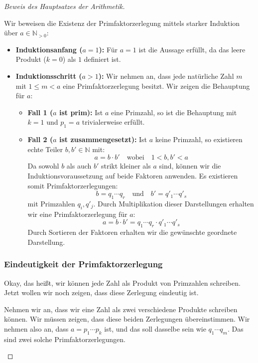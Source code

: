 \begin{proof}[Beweis des Hauptsatzes der Arithmetik]
\begin{math-stroke}
Wir beweisen die Existenz der Primfaktorzerlegung mittels starker Induktion über $a \in \mathbb{N}_{>0}$:
\begin{itemize}
    \item \textbf{Induktionsanfang ($a = 1$):}
    Für $a = 1$ ist die Aussage erfüllt, da das leere Produkt ($k = 0$) als $1$ definiert ist.
    
    \item \textbf{Induktionsschritt ($a > 1$):}
    Wir nehmen an, dass jede natürliche Zahl $m$ mit $1 \le m < a$ eine Primfaktorzerlegung besitzt. Wir zeigen die Behauptung für $a$:
    \begin{itemize}
        \item \textbf{Fall 1 ($a$ ist prim):}
        Ist $a$ eine Primzahl, so ist die Behauptung mit $k = 1$ und $p_1 = a$ trivialerweise erfüllt.
        
        \item \textbf{Fall 2 ($a$ ist zusammengesetzt):}
        Ist $a$ keine Primzahl, so existieren echte Teiler $b, b' \in \mathbb{N}$ mit:
        \[ a = b \cdot b' \quad \text{wobei} \quad 1 < b, b' < a \]
        Da sowohl $b$ als auch $b'$ strikt kleiner als $a$ sind, können wir die Induktionsvoraussetzung auf beide Faktoren anwenden. Es existieren somit Primfaktorzerlegungen:
        \[ b = q_1 \cdots q_r \quad \text{und} \quad b' = q'_1 \cdots q'_s \]
        mit Primzahlen $q_i, q'_j$. Durch Multiplikation dieser Darstellungen erhalten wir eine Primfaktorzerlegung für $a$:
        \[ a = b \cdot b' = q_1 \cdots q_r \cdot q'_1 \cdots q'_s \]
        Durch Sortieren der Faktoren erhalten wir die gewünschte geordnete Darstellung.
    \end{itemize}
\end{itemize}
\end{math-stroke}

\subsubsection{Eindeutigkeit der Primfaktorzerlegung}

\begin{spoken-clean}[00:52:18 - 00:53:43]
Okay, das heißt, wir können jede Zahl als Produkt von Primzahlen schreiben. Jetzt wollen wir noch zeigen, dass diese Zerlegung eindeutig ist.

Nehmen wir an, dass wir eine Zahl als zwei verschiedene Produkte schreiben können. Wir müssen zeigen, dass diese beiden Zerlegungen übereinstimmen. Wir nehmen also an, dass $a = p_1 \cdots p_k$ ist, und das soll dasselbe sein wie $q_1 \cdots q_m$. Das sind zwei solche Primfaktorzerlegungen.
\end{spoken-clean}


\end{proof}
